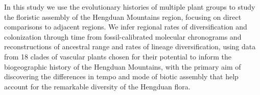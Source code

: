 


In this study we use the evolutionary histories of multiple plant groups to study the floristic assembly of the Hengduan Mountains region, focusing on direct comparisons to adjacent regions. We infer regional rates of diversification and colonization through time from fossil-calibrated molecular chronograms and reconstructions of ancestral range and rates of lineage diversification, using data from 18 clades of vascular plants chosen for their potential to inform the biogeographic history of the Hengduan Mountains, with the primary aim of discovering the differences in tempo and mode of biotic assembly that help account for the remarkable diversity of the Hengduan flora.


